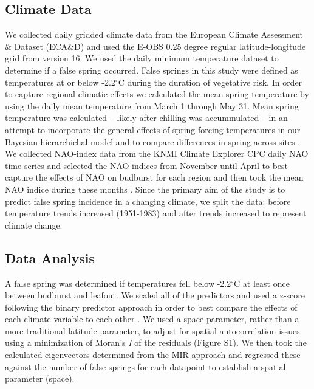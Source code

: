 \documentclass{article}\usepackage[]{graphicx}\usepackage[]{color}
\begin{document}
\subsection*{Climate Data}
We collected daily gridded climate data from the European Climate Assessment \& Dataset (ECA\&D) and used the E-OBS 0.25 degree regular latitude-longitude grid from version 16. We used the daily minimum temperature dataset to determine if a false spring occurred. False springs in this study were defined as temperatures at or below -2.2$^{\circ}$C \citep{Schwartz1993} during the duration of vegetative risk. In order to capture regional climatic effects we calculated the mean spring temperature by using the daily mean temperature from March 1 through May 31. Mean spring temperature was calculated -- likely after chilling was accummulated -- in an attempt to incorporate the general effects of spring forcing temperatures in our Bayesian hierarchichal model and to compare differences in spring across sites \citep{Basler2012, Korner2016}. We collected NAO-index data from the KNMI Climate Explorer CPC daily NAO time series and selected the NAO indices from November until April to best capture the effects of NAO on budburst for each region and then took the mean NAO indice during these months \citep{NAOdata}. Since the primary aim of the study is to predict false spring incidence in a changing climate, we split the data: before temperature trends increased (1951-1983) and after trends increased \citep[1984-2016,][]{Stocker2013, Kharouba2018} to represent climate change.

\subsection*{Data Analysis}
A false spring was determined if temperatures fell below -2.2$^{\circ}$C at least once between budburst and leafout. We scaled all of the predictors and used a z-score following the binary predictor approach in order to best compare the effects of each climate variable to each other \citep{Gelman2006}. We used a space parameter, rather than a more traditional latitude parameter, to adjust for spatial autocorrelation issues using a minimization of Moran's \textit{I} of the residuals \citep{Baumen2017} (Figure S1). We then took the calculated eigenvectors determined from the MIR approach and regressed these against the number of false springs for each datapoint to establish a spatial parameter (space). %
\end{document}
